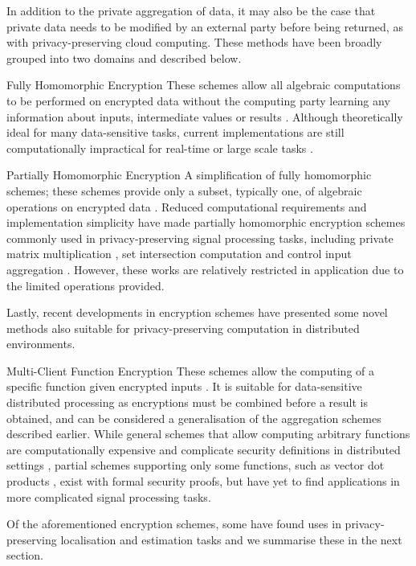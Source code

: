 \documentclass[10pt,journal,compsoc]{IEEEtran}
\theoremstyle{definition}
\theoremstyle{definition}
\theoremstyle{remark}
\begin{document}
In addition to the private aggregation of data, it may also be the case that private data needs to be modified by an external party before being returned, as with privacy-preserving cloud computing. These methods have been broadly grouped into two domains and described below.
\begin{LaTeXdescription}
    \item[Fully Homomorphic Encryption] These schemes allow all algebraic computations to be performed on encrypted data without the computing party learning any information about inputs, intermediate values or results \cite{gentryFullyHomomorphicEncryption2009,stehleFasterFullyHomomorphic2010}. Although theoretically ideal for many data-sensitive tasks, current implementations are still computationally impractical for real-time or large scale tasks \cite{acarSurveyHomomorphicEncryption2018}.
    \item[Partially Homomorphic Encryption] A simplification of fully homomorphic schemes; these schemes provide only a subset, typically one, of algebraic operations on encrypted data \cite{elgamalPublicKeyCryptosystem1985,paillierPublicKeyCryptosystemsBased1999,bonehEvaluating2DNFFormulas2005}. Reduced computational requirements and implementation simplicity have made partially homomorphic encryption schemes commonly used in privacy-preserving signal processing tasks, including private matrix multiplication \cite{kogisoCyberSecurityEnhancementNetworked2015}, set intersection computation \cite{kerschbaumOutsourcedPrivateSet2012} and control input aggregation \cite{alexandruEncryptedCooperativeControl2019}. However, these works are relatively restricted in application due to the limited operations provided.
\end{LaTeXdescription}
Lastly, recent developments in encryption schemes have presented some novel methods also suitable for privacy-preserving computation in distributed environments.
\begin{LaTeXdescription}
    \item[Multi-Client Function Encryption] These schemes allow the computing of a specific function given encrypted inputs \cite{bonehFunctionalEncryptionDefinitions2011,goldwasserMultiinputFunctionalEncryption2014}. It is suitable for data-sensitive distributed processing as encryptions must be combined before a result is obtained, and can be considered a generalisation of the aggregation schemes described earlier. While general schemes that allow computing arbitrary functions are computationally expensive and complicate security definitions in distributed settings \cite{agrawalFunctionalEncryptionNew2013}, partial schemes supporting only some functions, such as vector dot products \cite{chotardDecentralizedMultiClientFunctional2018}, exist with formal security proofs, but have yet to find applications in more complicated signal processing tasks.
\end{LaTeXdescription}
Of the aforementioned encryption schemes, some have found uses in privacy-preserving localisation and estimation tasks and we summarise these in the next section.
\end{document}
